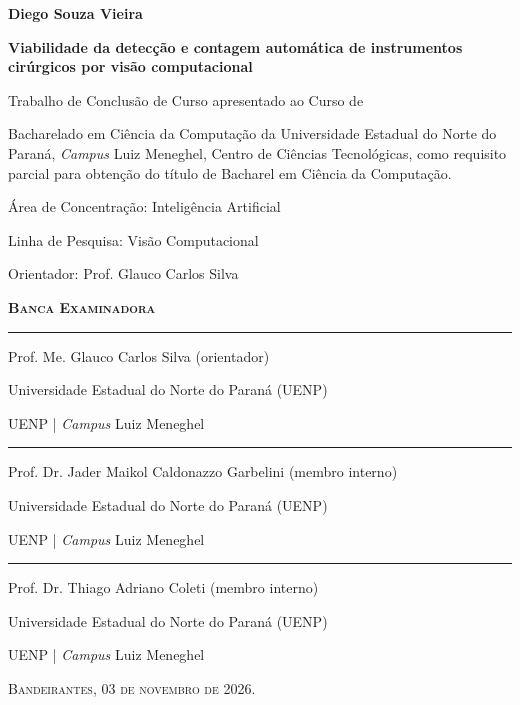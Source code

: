 \thispagestyle{empty}
\begin{center}

{\fontsize{14}{14} \selectfont \textbf{Diego Souza Vieira}}

\vspace{1cm}

{\fontsize{14}{14}\selectfont\textbf{Viabilidade da detecção e contagem automática de instrumentos cirúrgicos por visão computacional}}

\vspace{1cm}

{\fontsize{14}{14}\selectfont Trabalho de Conclusão de Curso apresentado ao Curso de

Bacharelado em Ciência da Computação da Universidade Estadual do Norte do Paraná, \textit{Campus} Luiz Meneghel, Centro de Ciências Tecnológicas, como requisito parcial para obtenção do título de Bacharel em Ciência da Computação.
\vspace{0.2cm}

Área de Concentração: Inteligência Artificial

\vspace{0.2cm}

Linha de Pesquisa: Visão Computacional
\vspace{0.2cm}

Orientador: Prof. Glauco Carlos Silva}
\vspace{2cm}

{\Versal \textsc{\textbf{Banca Examinadora}}}

\vspace{2cm}

\hrule
\vspace{11pt}
{\fontsize{14}{14}\selectfont Prof. Me. Glauco Carlos Silva (orientador)}

Universidade Estadual do Norte do Paraná (UENP)

UENP | \textit{Campus} Luiz Meneghel
\vspace{1.6cm}
\hrule
\vspace{11pt}
Prof. Dr. Jader Maikol Caldonazzo Garbelini (membro interno)

Universidade Estadual do Norte do Paraná (UENP)

UENP | \textit{Campus} Luiz Meneghel
\vspace{1.6cm}
\hrule
\vspace{11pt}
Prof. Dr. Thiago Adriano Coleti (membro interno)

Universidade Estadual do Norte do Paraná (UENP)

UENP | \textit{Campus} Luiz Meneghel
\vspace{1cm}

\Versal \textsc{Bandeirantes, 03 de novembro de 2026.}
\end{center}
